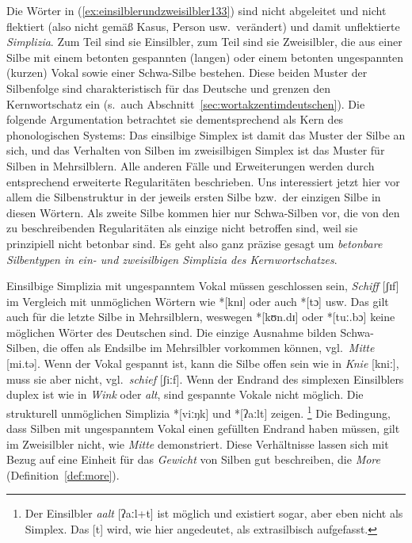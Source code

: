 Die Wörter in (\ref{ex:einsilblerundzweisilbler133}) sind nicht abgeleitet und nicht flektiert (also nicht gemäß Kasus, Person usw.\ verändert) und damit unflektierte \textit{Simplizia}.
Zum Teil sind sie Einsilbler, zum Teil sind sie Zweisilbler, die aus einer Silbe mit einem betonten gespannten (langen) oder einem betonten ungespannten (kurzen) Vokal sowie einer Schwa-Silbe bestehen.
Diese beiden Muster der Silbenfolge sind charakteristisch für das Deutsche und grenzen den Kernwortschatz ein (s.\ auch Abschnitt~\ref{sec:wortakzentimdeutschen}).
Die folgende Argumentation betrachtet sie dementsprechend als Kern des phonologischen Systems:
Das einsilbige Simplex ist damit das Muster der Silbe an sich, und das Verhalten von Silben im zweisilbigen Simplex ist das Muster für Silben in Mehrsilblern.
Alle anderen Fälle und Erweiterungen werden durch entsprechend erweiterte Regularitäten beschrieben.
Uns interessiert jetzt hier vor allem die Silbenstruktur in der jeweils ersten Silbe bzw.\ der einzigen Silbe in diesen Wörtern.
Als zweite Silbe kommen hier nur Schwa-Silben vor, die von den zu beschreibenden Regularitäten als einzige nicht betroffen sind, weil sie prinzipiell nicht betonbar sind.
Es geht also ganz präzise gesagt um \textit{betonbare Silbentypen in ein- und zweisilbigen Simplizia des Kernwortschatzes}.

Einsilbige Simplizia mit ungespanntem Vokal müssen geschlossen sein, \zB \textit{Schiff} [ʃɪf] im Vergleich mit unmöglichen Wörtern wie *[knɪ] oder auch *[tɔ] usw.
Das gilt auch für die letzte Silbe in Mehrsilblern, weswegen *[kʊn.dɪ] oder *[tuː.bɔ] keine möglichen Wörter des Deutschen sind.
Die einzige Ausnahme bilden Schwa-Silben, die offen als Endsilbe im Mehrsilbler vorkommen können, vgl.\ \textit{Mitte} [mi.tə].
Wenn der Vokal gespannt ist, kann die Silbe offen sein wie in \textit{Knie} [kniː], muss sie aber nicht, vgl.\ \textit{schief} [ʃiːf].
Wenn der Endrand des simplexen Einsilblers duplex ist wie in \textit{Wink} oder \textit{alt}, sind gespannte Vokale nicht möglich.
Die strukturell unmöglichen Simplizia *[viːŋk] und *[ʔaːlt] zeigen.%
\footnote{Der Einsilbler \textit{aalt} [ʔaːl+t] ist möglich und existiert sogar, aber eben nicht als Simplex.
Das [t] wird, wie hier angedeutet, als extrasilbisch aufgefasst.}
Die Bedingung, dass Silben mit ungespanntem Vokal einen gefüllten Endrand haben müssen, gilt im Zweisilbler nicht, wie \textit{Mitte} demonstriert.
Diese Verhältnisse lassen sich mit Bezug auf eine Einheit für das \textit{Gewicht} von Silben gut beschreiben, die \textit{More} (Definition~\ref{def:more}).

